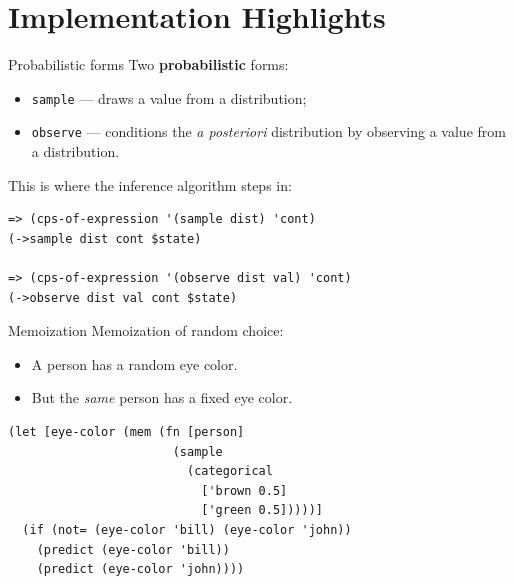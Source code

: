 \documentclass{beamer}
\begin{document}
\section{Implementation Highlights}

\begin{frame}[fragile]{Probabilistic forms}
    Two \textbf{probabilistic} forms:
    \begin{itemize}
        \item \texttt{sample} --- draws a value from a
            distribution;
        \item \texttt{observe} --- conditions the \textit{a
            posteriori} distribution by observing a value from a
            distribution.
    \end{itemize}
    \bigskip
    This is where the inference algorithm steps in:
\begin{verbatim}
=> (cps-of-expression '(sample dist) 'cont)
(->sample dist cont $state)

=> (cps-of-expression '(observe dist val) 'cont)
(->observe dist val cont $state)
\end{verbatim}
\end{frame}

\begin{frame}[fragile]{Memoization}
Memoization of random choice:
\begin{itemize}
    \item A person has a random eye color.
    \item But the \textit{same} person has a fixed eye color.
\end{itemize}
\begin{verbatim}
(let [eye-color (mem (fn [person] 
                       (sample 
                         (categorical
                           ['brown 0.5]
                           ['green 0.5]))))]
  (if (not= (eye-color 'bill) (eye-color 'john))
    (predict (eye-color 'bill))
    (predict (eye-color 'john))))
\end{verbatim}
\end{frame}
\end{document}

